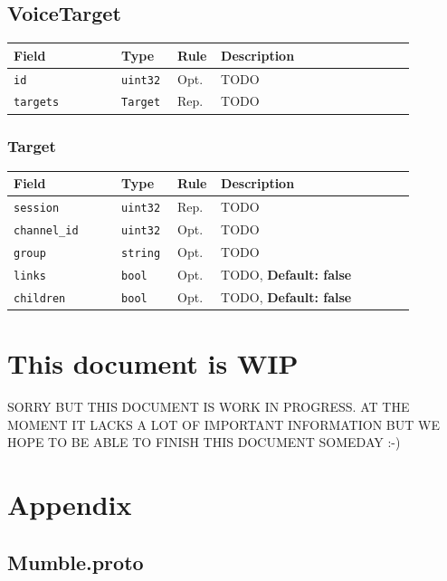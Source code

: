 \documentclass[11pt]{article} %
\newenvironment{mumbleMessageEx}
{%
	\small
	\renewcommand\arraystretch{1.5}
	\begin{tabular}{p{0.25\linewidth}p{0.13\linewidth}p{0.05\linewidth}p{0.45\linewidth}}
	Field & Type & Rule & Description \\
	\hline
}
{%
	\end{tabular}
	\renewcommand\arraystretch{1.0}
}
\newcommand{\mumbleMessageExItem}[4]{ \texttt{#1} & \texttt{#2} & #3 & #4 \\ }
\begin{document}
\subsection{VoiceTarget}

\begin{mumbleMessageEx}
\mumbleMessageExItem{id}{uint32}{Opt.}{TODO}
\mumbleMessageExItem{targets}{Target}{Rep.}{TODO}
\end{mumbleMessageEx}

\subsubsection{Target}

\begin{mumbleMessageEx}
\mumbleMessageExItem{session}{uint32}{Rep.}{TODO}
\mumbleMessageExItem{channel\_id}{uint32}{Opt.}{TODO}
\mumbleMessageExItem{group}{string}{Opt.}{TODO}
\mumbleMessageExItem{links}{bool}{Opt.}{TODO, \textbf{Default: false}}
\mumbleMessageExItem{children}{bool}{Opt.}{TODO, \textbf{Default: false}}
\end{mumbleMessageEx}




\section {This document is WIP}
SORRY BUT THIS DOCUMENT IS WORK IN PROGRESS. AT THE MOMENT IT LACKS A LOT OF IMPORTANT INFORMATION BUT WE HOPE TO BE ABLE TO FINISH THIS DOCUMENT SOMEDAY :-)

\appendix
\section{Appendix}
\subsection{Mumble.proto}
\label{appendix:mumble_proto}
\end{document}
